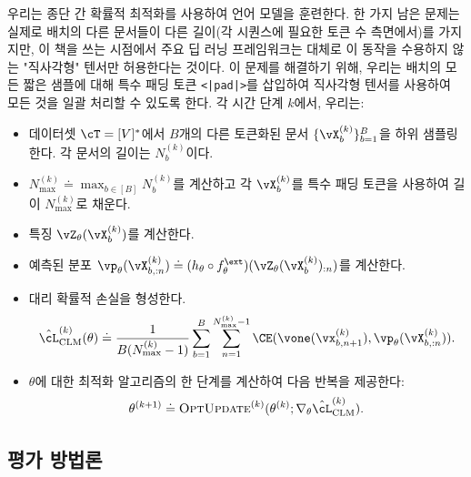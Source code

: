 \documentclass[../../book-main_ko.tex]{subfiles}
\begin{document}
우리는 종단 간 확률적 최적화를 사용하여 언어 모델을 훈련한다. 한 가지 남은 문제는 실제로 배치의 다른 문서들이 다른 길이(각 시퀀스에 필요한 토큰 수 측면에서)를 가지지만, 이 책을 쓰는 시점에서 주요 딥 러닝 프레임워크는 대체로 이 동작을 수용하지 않는 "직사각형" 텐서만 허용한다는 것이다. 이 문제를 해결하기 위해, 우리는 배치의 모든 짧은 샘플에 대해 특수 패딩 토큰 \texttt{<|pad|>}를 삽입하여 직사각형 텐서를 사용하여 모든 것을 일괄 처리할 수 있도록 한다. 각 시간 단계 \(k\)에서, 우리는:
\begin{itemize}
    \item 데이터셋 \(\cT = [V]^{*}\)에서 \(B\)개의 다른 토큰화된 문서 \(\{\vX_{b}^{(k)}\}_{b = 1}^{B}\)을 하위 샘플링한다. 각 문서의 길이는 \(N_{b}^{(k)}\)이다.
    \item \(N_{\max}^{(k)} \doteq \max_{b \in [B]}N_{b}^{(k)}\)를 계산하고 각 \(\vX_{b}^{(k)}\)를 특수 패딩 토큰을 사용하여 길이 \(N_{\max}^{(k)}\)로 채운다.
    \item 특징 \(\vZ_{\theta}(\vX_{b}^{(k)})\)를 계산한다.
    \item 예측된 분포 \(\vp_{\theta}(\vX_{b, :n}^{(k)}) \doteq (h_{\theta} \circ f_{\theta}^{\ext})(\vZ_{\theta}(\vX_{b}^{(k)})_{:n})\)를 계산한다.
    \item 대리 확률적 손실을 형성한다.
    \begin{equation}
        \hat{\cL}_{\mathrm{CLM}}^{(k)}(\theta) \doteq \frac{1}{B(N_{\max}^{(k)} - 1)}\sum_{b = 1}^{B}\sum_{n = 1}^{N_{\max}^{(k)}-1}\CE(\vone(\vx_{b, n + 1}^{(k)}), \vp_{\theta}(\vX_{b, :n}^{(k)})).
    \end{equation}
    \item \(\theta\)에 대한 최적화 알고리즘의 한 단계를 계산하여 다음 반복을 제공한다:
    \begin{equation}
        \theta^{(k + 1)} \doteq \textsc{OptUpdate}^{(k)}(\theta^{(k)}; \nabla_{\theta}\hat{\cL}_{\mathrm{CLM}}^{(k)}).
    \end{equation}
\end{itemize}

\subsection{평가 방법론} \label{sub:clm_text_evals}
\end{document}
